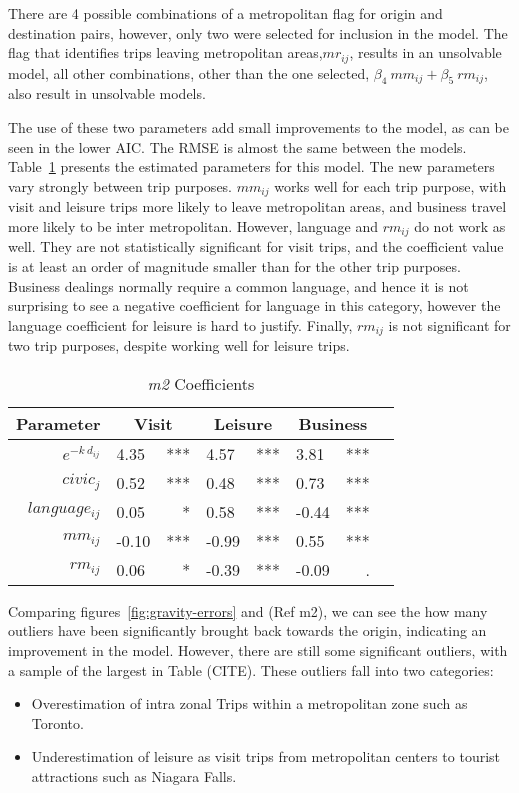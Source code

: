 There are 4 possible combinations of a metropolitan flag for origin and destination pairs, however, only two were selected for inclusion in the model. The flag that identifies trips leaving metropolitan areas,$mr_{ij}$, results in an unsolvable model, all other combinations, other than the one selected, $\beta_4~mm_{ij} + \beta_5~rm_{ij}$, also result in unsolvable models. 

The use of these two parameters add small improvements to the model, as can be seen in the lower AIC. The RMSE is almost the same between the models. Table~\ref{table:m2-coeff} presents the estimated parameters for this model. The new parameters vary strongly between trip purposes. 
$mm_{ij}$  works well for each trip purpose, with visit and leisure trips more likely to leave metropolitan areas, and business travel more likely to be inter metropolitan. However, language and $rm_{ij}$  do not work as well. They are not statistically significant for visit trips, and the coefficient value is at least an order of magnitude smaller than for the other trip purposes. Business dealings normally require a common language, and hence it is not surprising to see a negative coefficient for language in this category, however the language coefficient for leisure is hard to justify. Finally, $rm_{ij}$  is not significant for two trip purposes, despite working well for leisure trips. 

\begin{table}[H]
\centering
\caption{\textit{m2} Coefficients}
\label{table:m2-coeff}
\begin{tabular}{@{}rlrlrlrl@{}}
  \toprule
 Parameter & \multicolumn{2}{c}{Visit} & \multicolumn{2}{c}{Leisure} & \multicolumn{2}{c}{Business} &  \\ \midrule
  $e^{-k\ d_{ij}}$ 	& 4.35 & *** & 4.57 & *** & 3.81 & *** \\  
  $civic_j$ 		& 0.52 	& *** & 0.48 & *** & 0.73 & *** \\  
  $language_{ij}$ 	& 0.05 & * & 0.58 & *** & -0.44 & *** \\ 
  $mm_{ij}$  		& -0.10 & *** & -0.99 & *** & 0.55 & *** \\ 
  $rm_{ij}$			& 0.06 & * & -0.39 & *** & -0.09 & . \\  
   \bottomrule
\end{tabular}
\end{table}

Comparing figures~\ref{fig:gravity-errors} and (Ref m2), we can see the how many outliers have been significantly brought back towards the origin, indicating an improvement in the model. However, there are still some significant outliers, with a sample of the largest in Table (CITE). These outliers fall into two categories:
\begin{itemize}
\item Overestimation of intra zonal Trips within a metropolitan zone such as Toronto.
\item Underestimation of leisure  as visit trips  from metropolitan centers  to tourist attractions such as Niagara Falls.
\end{itemize}

